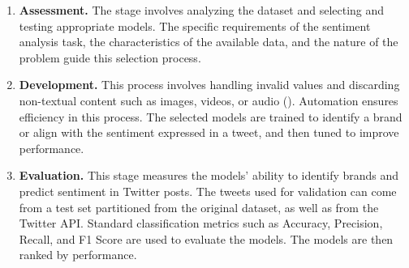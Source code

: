 \documentclass{article}
\begin{document}
\begin{enumerate}[leftmargin=*]

    \item \textbf{Assessment.} The stage involves analyzing the dataset and selecting and testing appropriate models. The specific requirements of the sentiment analysis task, the characteristics of the available data, and the nature of the problem guide this selection process.

    \item \textbf{Development.} This process involves handling invalid values and discarding non-textual content such as images, videos, or audio (\cite{ducange2019effective}). Automation ensures efficiency in this process. The selected models are trained to identify a brand or align with the sentiment expressed in a tweet, and then tuned to improve performance.

    \item \textbf{Evaluation.} This stage measures the models' ability to identify brands and predict sentiment in Twitter posts. The tweets used for validation can come from a test set partitioned from the original dataset, as well as from the Twitter API. Standard classification metrics such as Accuracy, Precision, Recall, and F1 Score are used to evaluate the models. The models are then ranked by performance.

\end{enumerate}
\end{document}
